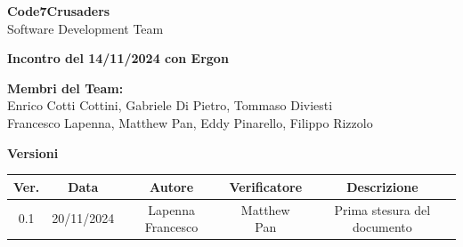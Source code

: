 \documentclass{article}
\begin{document}
\begin{titlepage}
    {\Huge \textbf{Code7Crusaders}}\\
    \vspace{0.5cm}
    {\Large Software Development Team}\\
    \vspace{2cm}
    
    {\large \textbf{Incontro del 14/11/2024 con Ergon}}\\ %
    \vspace{5cm}                           %
    
    
    \textbf{Membri del Team:}\\
    Enrico Cotti Cottini, Gabriele Di Pietro, Tommaso Diviesti \\
    Francesco Lapenna, Matthew Pan, Eddy Pinarello, Filippo Rizzolo \\
    \vspace{0.5cm}
    
    \vspace{1cm}
\end{titlepage}



\newpage
\begin{table}[h!]
\centering
\textbf{Versioni} \\ %
\vspace{2mm} %
\begin{tabular}{|c|c|c|c|c|}
    \hline
    \textbf{Ver.} & \textbf{Data} & \textbf{Autore} & \textbf{Verificatore} & \textbf{Descrizione} \\
    \hline
    0.1 & 20/11/2024 & Lapenna Francesco & Matthew Pan & Prima stesura del documento \\ 
    \hline                                  %
\end{tabular}
\end{table}



\newpage
\tableofcontents
\end{document}
